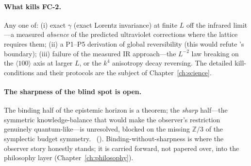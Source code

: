 \paragraph{What kills FC-2.} Any one of: (i) exact $\gamma$ (exact Lorentz
invariance) at finite $L$ off the infrared limit---a measured \emph{absence} of
the predicted ultraviolet corrections where the lattice requires them; (ii) a
P1--P5 derivation of global reversibility (this would refute 's
boundary); (iii) failure of the measured IR approach---the $L^{-2}$ law breaking
on the $\langle 100\rangle$ axis at larger $L$, or the $k^4$ anisotropy decay
reversing. The detailed kill-conditions and their protocols are the subject of
Chapter~\ref{ch:science}.

\paragraph{The sharpness of the blind spot is open.} The binding half of the
epistemic horizon is a theorem; the \emph{sharp} half---the symmetric
knowledge-balance that would make the observer's restriction genuinely
quantum-like---is unresolved, blocked on the missing $\mathbb{Z}/3$ of the
symplectic budget symmetry. ~(). Binding-without-sharpness
is where the observer story honestly stands; it is carried forward, not papered
over, into the philosophy layer (Chapter~\ref{ch:philosophy}).
